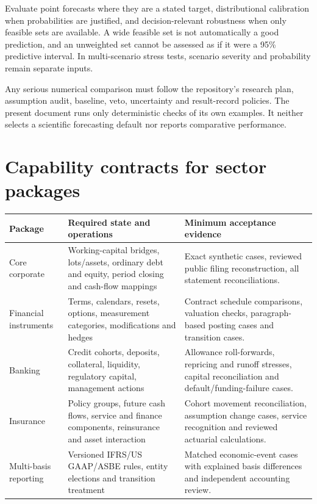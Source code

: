 Evaluate point forecasts where they are a stated target, distributional
calibration when probabilities are justified, and decision-relevant robustness
when only feasible sets are available. A wide feasible set is not automatically
a good prediction, and an unweighted set cannot be assessed as if it were a
95\% predictive interval. In multi-scenario stress tests, scenario severity and
probability remain separate inputs.

Any serious numerical comparison must follow the repository's research plan,
assumption audit, baseline, veto, uncertainty and result-record policies. The
present document runs only deterministic checks of its own examples. It
neither selects a scientific forecasting default nor reports comparative
performance.

\section{Capability contracts for sector packages}

\begin{longtable}{L{26mm}L{55mm}L{55mm}}
\toprule Package & Required state and operations & Minimum acceptance evidence\\\midrule\endhead
Core corporate & Working-capital bridges, lots/assets, ordinary debt and equity,
period closing and cash-flow mappings & Exact synthetic cases, reviewed public
filing reconstruction, all statement reconciliations.\\
Financial instruments & Terms, calendars, resets, options, measurement
categories, modifications and hedges & Contract schedule comparisons, valuation
checks, paragraph-based posting cases and transition cases.\\
Banking & Credit cohorts, deposits, collateral, liquidity, regulatory capital,
management actions & Allowance roll-forwards, repricing and runoff stresses,
capital reconciliation and default/funding-failure cases.\\
Insurance & Policy groups, future cash flows, service and finance components,
reinsurance and asset interaction & Cohort movement reconciliation, assumption
change cases, service recognition and reviewed actuarial calculations.\\
Multi-basis reporting & Versioned IFRS/US GAAP/ASBE rules, entity elections and
transition treatment & Matched economic-event cases with explained basis
differences and independent accounting review.\\\bottomrule
\end{longtable}

